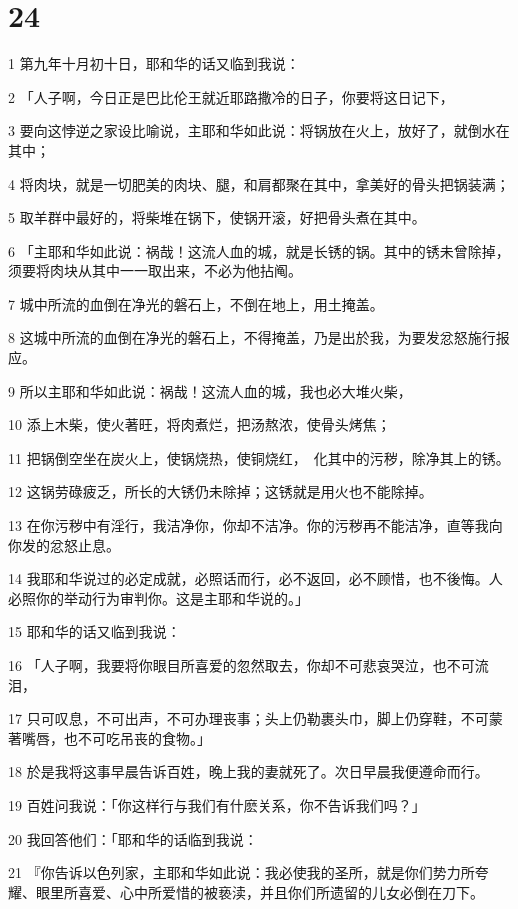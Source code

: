 \chapter{24}

\par 1 第九年十月初十日，耶和华的话又临到我说：
\par 2 「人子啊，今日正是巴比伦王就近耶路撒冷的日子，你要将这日记下，
\par 3 要向这悖逆之家设比喻说，主耶和华如此说：将锅放在火上，放好了，就倒水在其中；
\par 4 将肉块，就是一切肥美的肉块、腿，和肩都聚在其中，拿美好的骨头把锅装满；
\par 5 取羊群中最好的，将柴堆在锅下，使锅开滚，好把骨头煮在其中。
\par 6 「主耶和华如此说：祸哉！这流人血的城，就是长锈的锅。其中的锈未曾除掉，须要将肉块从其中一一取出来，不必为他拈阄。
\par 7 城中所流的血倒在净光的磐石上，不倒在地上，用土掩盖。
\par 8 这城中所流的血倒在净光的磐石上，不得掩盖，乃是出於我，为要发忿怒施行报应。
\par 9 所以主耶和华如此说：祸哉！这流人血的城，我也必大堆火柴，
\par 10 添上木柴，使火著旺，将肉煮烂，把汤熬浓，使骨头烤焦；
\par 11 把锅倒空坐在炭火上，使锅烧热，使铜烧红，　化其中的污秽，除净其上的锈。
\par 12 这锅劳碌疲乏，所长的大锈仍未除掉；这锈就是用火也不能除掉。
\par 13 在你污秽中有淫行，我洁净你，你却不洁净。你的污秽再不能洁净，直等我向你发的忿怒止息。
\par 14 我耶和华说过的必定成就，必照话而行，必不返回，必不顾惜，也不後悔。人必照你的举动行为审判你。这是主耶和华说的。」
\par 15 耶和华的话又临到我说：
\par 16 「人子啊，我要将你眼目所喜爱的忽然取去，你却不可悲哀哭泣，也不可流泪，
\par 17 只可叹息，不可出声，不可办理丧事；头上仍勒裹头巾，脚上仍穿鞋，不可蒙著嘴唇，也不可吃吊丧的食物。」
\par 18 於是我将这事早晨告诉百姓，晚上我的妻就死了。次日早晨我便遵命而行。
\par 19 百姓问我说：「你这样行与我们有什麽关系，你不告诉我们吗？」
\par 20 我回答他们：「耶和华的话临到我说：
\par 21 『你告诉以色列家，主耶和华如此说：我必使我的圣所，就是你们势力所夸耀、眼里所喜爱、心中所爱惜的被亵渎，并且你们所遗留的儿女必倒在刀下。

